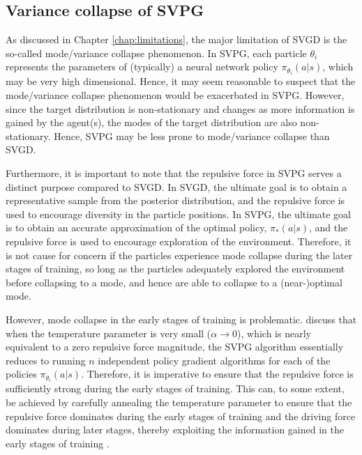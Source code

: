\subsection*{Variance collapse of SVPG}


As discussed in Chapter \ref{chap:limitations}, the major limitation of SVGD is the so-called mode/variance collapse phenomenon. In SVPG, each particle $\theta_i$ represents the parameters of (typically) a neural network policy $\pi_{\theta_i}(a|s)$, which may be very high dimensional. Hence, it may seem reasonable to suspect that the mode/variance collapse phenomenon would be exacerbated in SVPG. However, since the target distribution is non-stationary and changes as more information is gained by the agent(s), the modes of the target distribution are also non-stationary. Hence, SVPG may be less prone to mode/variance collapse than SVGD.

Furthermore, it is important to note that the repulsive force in SVPG serves a distinct purpose compared to SVGD. In SVGD, the ultimate goal is to obtain a representative sample from the posterior distribution, and the repulsive force is used to encourage diversity in the particle positions. In SVPG, the ultimate goal is to obtain an accurate approximation of the optimal policy, $\pi_*(a|s)$, and the repulsive force is used to encourage exploration of the environment. Therefore, it is not cause for concern if the particles experience mode collapse during the later stages of training, so long as the particles adequately explored the environment before collapsing to a mode, and hence are able to collapse to a (near-)optimal mode.

However, mode collapse in the early stages of training is problematic. \citet{liu_svpg} discuss that when the temperature parameter is very small ($\alpha \rightarrow 0$), which is nearly equivalent to a zero repulsive force magnitude, the SVPG algorithm essentially reduces to running $n$ independent policy gradient algorithms for each of the policies $\pi_{\theta_i}(a|s)$. Therefore, it is imperative to ensure that the repulsive force is sufficiently strong during the early stages of training. This can, to some extent, be achieved by carefully annealing the temperature parameter to ensure that the repulsive force dominates during the early stages of training and the driving force dominates during later stages, thereby exploiting the information gained in the early stages of training \citep{liu_svpg}.

